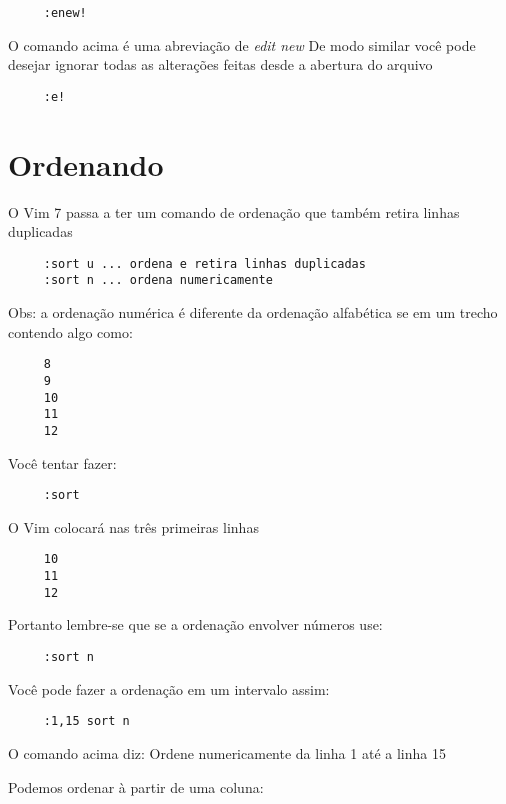 \begin{verbatim}
     :enew!
\end{verbatim}

O comando acima é uma abreviação de {\em edit new} De modo similar você pode
desejar ignorar todas as alterações feitas desde a abertura do arquivo

\begin{verbatim}
     :e!
\end{verbatim}


\section{Ordenando}

O Vim 7 passa a ter um comando de ordenação que também retira linhas
duplicadas

\begin{verbatim}
     :sort u ... ordena e retira linhas duplicadas
     :sort n ... ordena numericamente
\end{verbatim}

Obs: a ordenação numérica é diferente da ordenação alfabética se em um
trecho contendo algo como:

\begin{verbatim}
     8
     9
     10
     11
     12
\end{verbatim}

Você tentar fazer:

\begin{verbatim}
     :sort
\end{verbatim}

O Vim colocará nas três primeiras linhas

\begin{verbatim}
     10
     11
     12
\end{verbatim}

Portanto lembre-se que se a ordenação envolver números use:

\begin{verbatim}
     :sort n
\end{verbatim}

Você pode fazer a ordenação em um intervalo assim:

\begin{verbatim}
     :1,15 sort n
\end{verbatim}

O comando acima diz: Ordene numericamente da linha 1 até a linha 15

Podemos ordenar à partir de uma coluna:

